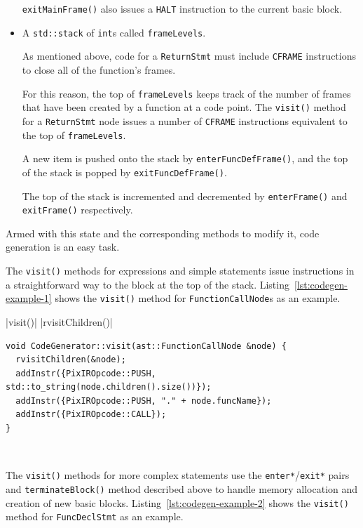 \documentclass[11pt,a4paper]{scrartcl}
\begin{document}
\begin{itemize}
        \verb|exitMainFrame()| also issues a \verb|HALT| instruction to the current basic block.

  \item A \verb|std::stack| of \verb|int|s called \verb|frameLevels|.

        As mentioned above, code for a \verb|ReturnStmt| must include \verb|CFRAME| instructions to close all of the function's frames.

        For this reason, the top of \verb|frameLevels| keeps track of the number of frames that have been created by a function at a code point. The \verb|visit()| method for a \verb|ReturnStmt| node issues a number of \verb|CFRAME| instructions equivalent to the top of \verb|frameLevels|.

        A new item is pushed onto the stack by \verb|enterFuncDefFrame()|, and the top of the stack is popped by \verb|exitFuncDefFrame()|.

        The top of the stack is incremented and decremented by \verb|enterFrame()| and \verb|exitFrame()| respectively.
\end{itemize}

Armed with this state and the corresponding methods to modify it, code generation is an easy task.

The \verb|visit()| methods for expressions and simple statements issue instructions in a straightforward way to the block at the top of the stack. Listing~\ref{lst:codegen-example-1} shows the \verb|visit()| method for \verb|FunctionCallNode|s as an example.

|visit()|
|rvisitChildren()|
\begin{lstfloat}

\begin{verbatim}
void CodeGenerator::visit(ast::FunctionCallNode &node) {
  rvisitChildren(&node);
  addInstr({PixIROpcode::PUSH, std::to_string(node.children().size())});
  addInstr({PixIROpcode::PUSH, "." + node.funcName});
  addInstr({PixIROpcode::CALL});
}
\end{verbatim}
  \caption{\protect{} method for \Verb|FunctionCallNode|s. Note the use of \protect{}, so that in the generated code each argument is pushed onto the stack in reverse order of declaration, as required by the semantics of the PixAR VM.}~\label{lst:codegen-example-1}
\end{lstfloat}

The \verb|visit()| methods for more complex statements use the \verb|enter*|/\verb|exit*| pairs and \verb|terminateBlock()| method described above to handle memory allocation and creation of new basic blocks. Listing~\ref{lst:codegen-example-2} shows the \verb|visit()| method for \verb|FuncDeclStmt| as an example.
\end{document}
